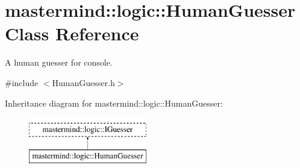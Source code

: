 \hypertarget{classmastermind_1_1logic_1_1_human_guesser}{}\section{mastermind\+:\+:logic\+:\+:Human\+Guesser Class Reference}
\label{classmastermind_1_1logic_1_1_human_guesser}


A human guesser for console.  




{\ttfamily \#include $<$Human\+Guesser.\+h$>$}

Inheritance diagram for mastermind\+:\+:logic\+:\+:Human\+Guesser\+:\begin{figure}[H]
\begin{center}
\leavevmode
\includegraphics[height=2.000000cm]{classmastermind_1_1logic_1_1_human_guesser}
\end{center}
\end{figure}
